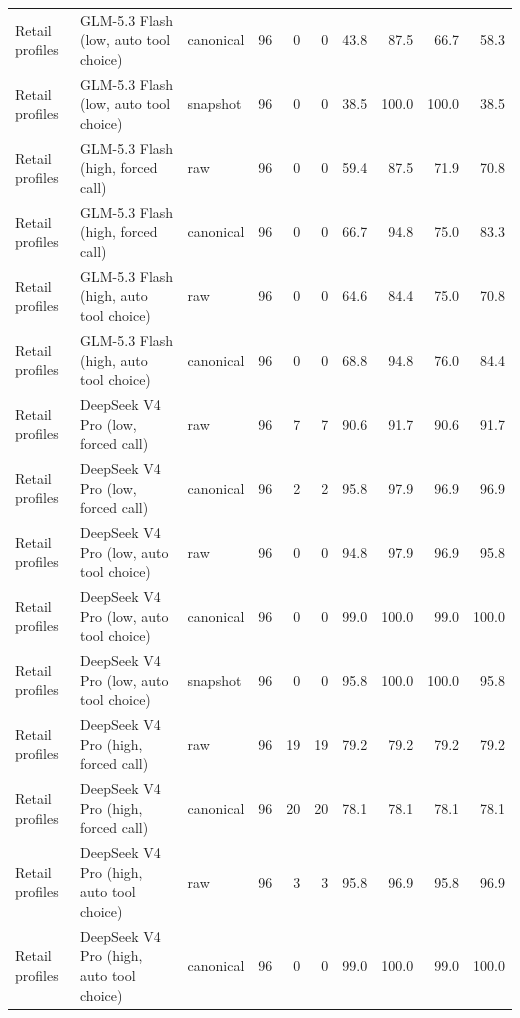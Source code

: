 {\begin{longtable}{lllrrrrrrr}
Retail profiles & GLM-5.3 Flash (low, auto tool choice) & canonical & 96 & 0 & 0 & 43.8 & 87.5 & 66.7 & 58.3 \\
Retail profiles & GLM-5.3 Flash (low, auto tool choice) & snapshot & 96 & 0 & 0 & 38.5 & 100.0 & 100.0 & 38.5 \\
Retail profiles & GLM-5.3 Flash (high, forced call) & raw & 96 & 0 & 0 & 59.4 & 87.5 & 71.9 & 70.8 \\
Retail profiles & GLM-5.3 Flash (high, forced call) & canonical & 96 & 0 & 0 & 66.7 & 94.8 & 75.0 & 83.3 \\
Retail profiles & GLM-5.3 Flash (high, auto tool choice) & raw & 96 & 0 & 0 & 64.6 & 84.4 & 75.0 & 70.8 \\
Retail profiles & GLM-5.3 Flash (high, auto tool choice) & canonical & 96 & 0 & 0 & 68.8 & 94.8 & 76.0 & 84.4 \\
Retail profiles & DeepSeek V4 Pro (low, forced call) & raw & 96 & 7 & 7 & 90.6 & 91.7 & 90.6 & 91.7 \\
Retail profiles & DeepSeek V4 Pro (low, forced call) & canonical & 96 & 2 & 2 & 95.8 & 97.9 & 96.9 & 96.9 \\
Retail profiles & DeepSeek V4 Pro (low, auto tool choice) & raw & 96 & 0 & 0 & 94.8 & 97.9 & 96.9 & 95.8 \\
Retail profiles & DeepSeek V4 Pro (low, auto tool choice) & canonical & 96 & 0 & 0 & 99.0 & 100.0 & 99.0 & 100.0 \\
Retail profiles & DeepSeek V4 Pro (low, auto tool choice) & snapshot & 96 & 0 & 0 & 95.8 & 100.0 & 100.0 & 95.8 \\
Retail profiles & DeepSeek V4 Pro (high, forced call) & raw & 96 & 19 & 19 & 79.2 & 79.2 & 79.2 & 79.2 \\
Retail profiles & DeepSeek V4 Pro (high, forced call) & canonical & 96 & 20 & 20 & 78.1 & 78.1 & 78.1 & 78.1 \\
Retail profiles & DeepSeek V4 Pro (high, auto tool choice) & raw & 96 & 3 & 3 & 95.8 & 96.9 & 95.8 & 96.9 \\
Retail profiles & DeepSeek V4 Pro (high, auto tool choice) & canonical & 96 & 0 & 0 & 99.0 & 100.0 & 99.0 & 100.0 \\
\end{longtable}}
